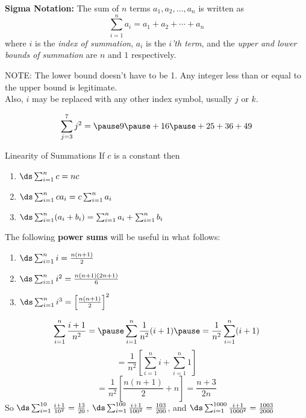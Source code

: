 
\begin{frame}
\begin{definition}
 {\bf Sigma Notation:} The sum of $n$ terms $a_1,a_2,\ldots,a_n$ is written as
\[
\sum_{i=1}^n a_i=a_1+a_2+\cdots+a_n
\]                                     
where $i$ is 	the {\it index of summation}, $a_i$ is the {\it{$i$'th term}}, and the 
{\it{upper and lower bounds of summation}} are $n$ and $1$ respectively.
\end{definition}
NOTE:  The lower bound doesn't have to be 1. 
 Any integer less than or equal to the upper bound is legitimate.\\
Also, $i$ may be replaced with any other index symbol, usually $j$ or $k$.\\
\pause
\begin{example}
\[
\sum_{j=3}^7 j^2= \pause 9\pause + 16\pause+25+36+49 
\]
\end{example}

\end{frame}

\begin{frame}{Linearity of Summations}
If $ c $ is a constant then 
\begin{enumerate}
\item $\ds  \sum_{i=1}^n c  =  nc $\\ \pause
\item $\ds \sum_{i=1}^n ca_i =  c\sum_{i=1}^n a_i $\\ \pause
\item $\ds  \sum_{i=1}^n (a_i+b_i)  =  \sum_{i=1}^n a_i + \sum_{i=1}^n b_i $
\end{enumerate}

\end{frame}


\begin{frame}
The following \textbf{power sums} will be useful in what follows:
\begin{enumerate}
\item $\ds  \sum_{i=1}^n i  =  \frac{n(n+1)}{2} $\pause
\item $\ds  \sum_{i=1}^n i^2  =  \frac{n(n+1)(2n+1)}{6} $\pause
\item $ \ds \sum_{i=1}^n i^3  =  \left[\frac{n(n+1)}{2}\right]^2 $
\end{enumerate}
\end{frame}


\begin{frame}
\begin{example}
\[
\sum_{i=1}^n \frac{i+1}{n^2} = \pause \sum_{i=1}^n \frac{1}{n^2}(i+1) \pause = \frac{1}{n^2} \sum_{i=1}^n (i+1) 
\]
\pause 
\[
= \frac{1}{n^2} \left[ \sum_{i=1}^n i+\sum_{i=1}^n 1 \right]
\]
\pause 
\[
= \frac{1}{n^2} \left[ \frac{n(n+1)}{2}+n \right] = \frac{n+3}{2n}
\]
\pause
So $ \ds \sum_{i=1}^{10} \frac{i+1}{10^2} =\frac{13}{20} $, \pause $ \ds \sum_{i=1}^{100} \frac{i+1}{100^2} =\frac{103}{200} $, \pause and $ \ds \sum_{i=1}^{1000} \frac{i+1}{1000^2} =\frac{1003}{2000} $ 
\end{example}
\end{frame}

